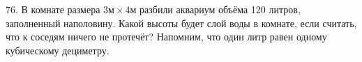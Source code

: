 76. В комнате размера $3\text{м}\times4\text{м}$ разбили аквариум объёма 120 литров, заполненный наполовину. Какой высоты будет слой воды в комнате, если считать, что к соседям ничего не протечёт? Напомним, что один литр равен одному кубическому дециметру.\\
